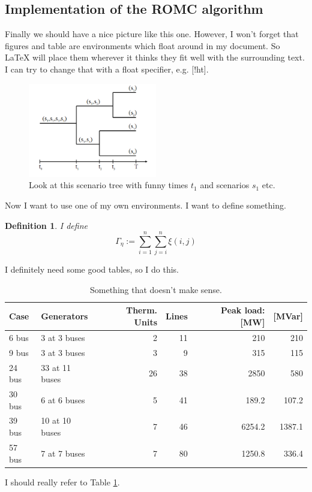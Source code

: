 \documentclass[11pt,twoside]{article}
\newtheorem{Definition}{Definition}
\numberwithin{Theorem}{section}
\numberwithin{Definition}{section}
\numberwithin{Lemma}{section}
\numberwithin{Algorithm}{section}
\numberwithin{equation}{section}
\begin{document}
\subsection{Implementation of the ROMC algorithm}
Finally we should have a nice picture like this one. However, I won't forget that figures and table are environments which float around in my document. So LaTeX will place them wherever it thinks they fit well with the surrounding text. I can try to change that with a float specifier, e.g. [!ht].
\begin{figure}[!ht]
\centering
\includegraphics[width=0.5\textwidth]{scenTree.png}
\caption{Look at this scenario tree with funny times $t_{1}$ and scenarios $s_{1}$ etc.}
\label{fig:scenarioTree}
\end{figure}
Now I want to use one of my own environments. I want to define something.
\begin{Definition}
 I define
$$
\Gamma_{\eta}:=\sum_{i=1}^{n}\sum_{j=i}^{n}\xi{}(i,j)
$$
\end{Definition}
I definitely need some good tables, so I do this.
\begin{table}[!ht]
\centering
\begin{tabular}{|ll|rrrr|}
\hline
Case&Generators&Therm. Units&Lines&Peak load: [MW]&[MVar]\\
\hline\hline
6 bus&3 at 3 buses&2&11&210&210\\
9 bus&3 at 3 buses&3&9&315&115\\
24 bus&33 at 11 buses&26&38&2850&580\\
30 bus&6 at 6 buses&5&41&189.2&107.2\\
39 bus&10 at 10 buses&7&46&6254.2&1387.1\\
57 bus&7 at 7 buses&7&80&1250.8&336.4\\
\hline
\end{tabular}
\caption{Something that doesn't make sense.}
\label{tab:things}
\end{table}
I should really refer to Table \ref{tab:things}.
\end{document}
